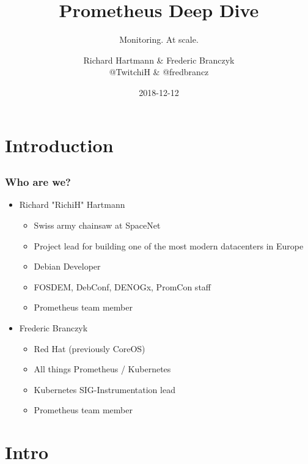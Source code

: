 \documentclass[aspectratio=169]{beamer}
\title{Prometheus Deep Dive}
\subtitle{Monitoring. At scale.}
\author{Richard Hartmann \& Frederic Branczyk\\
@TwitchiH \& @fredbrancz}
\date{2018-12-12}
\begin{document}
\setcounter{tocdepth}{1}



\section{Introduction}


\subsection{}

\begin{frame}
	\titlepage
\end{frame}


\subsection{}

\begin{frame}
	\frametitle{Who are we?}
	\begin{itemize}
		\item Richard "RichiH" Hartmann
		\begin{itemize}
			\item Swiss army chainsaw at SpaceNet
			\item Project lead for building one of the most modern datacenters in Europe
			\item Debian Developer
			\item FOSDEM, DebConf, DENOGx, PromCon staff
			\item Prometheus team member
		\end{itemize}
		\item Frederic Branczyk
		\begin{itemize}
			\item Red Hat (previously CoreOS)
			\item All things Prometheus / Kubernetes
			\item Kubernetes SIG-Instrumentation lead
			\item Prometheus team member
		\end{itemize}
	\end{itemize}
\end{frame}


\section{Intro}

\subsection{}
\end{document}
